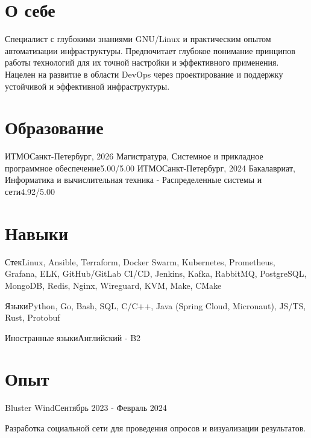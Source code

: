\documentclass[letterpaper,11pt]{article}
\begin{document}
\section{О себе}
\resumeHeadingListStart
  \resumeHeadingAbout
  {Специалист с глубокими знаниями GNU/Linux и практическим опытом автоматизации инфраструктуры. Предпочитает глубокое понимание принципов работы технологий для их точной настройки и эффективного применения. Нацелен на развитие в области DevOps через проектирование и поддержку устойчивой и эффективной инфраструктуры.}
\resumeHeadingListEnd

\section{Образование}
\resumeHeadingListStart
  \resumeHeadingEducation
    {ИТМО}{Санкт-Петербург, 2026}
    {Магистратура, Системное и прикладное программное обеспечение}{5.00/5.00}
  \resumeHeadingEducation
    {ИТМО}{Санкт-Петербург, 2024}
    {Бакалавриат, Информатика и вычислительная техника - Распределенные системы и сети}{4.92/5.00}
\resumeHeadingListEnd

\section{Навыки}
\resumeHeadingListStart
  \resumeHeadingSkills
  {Стек}{Linux, Ansible, Terraform, Docker Swarm, Kubernetes, Prometheus, Grafana, ELK, GitHub/GitLab CI/CD, Jenkins, Kafka, RabbitMQ, PostgreSQL, MongoDB, Redis, Nginx, Wireguard, KVM, Make, CMake}

  \resumeHeadingSkills
  {Языки}{Python, Go, Bash, SQL, C/C++, Java (Spring Cloud, Micronaut), JS/TS, Rust, Protobuf}

  \resumeHeadingSkills
  {Иностранные языки}{Английский - B2}
\resumeHeadingListEnd

\section{Опыт}
\resumeHeadingListStart
  \resumeHeadingExperience
  {Bluster Wind}{Сентябрь 2023 - Февраль 2024}

  \resumeDescription
  {Разработка социальной сети для проведения опросов и визуализации результатов.}

  \resumeItemListStart
  \resumeItemListEnd
\resumeHeadingListEnd
\end{document}
